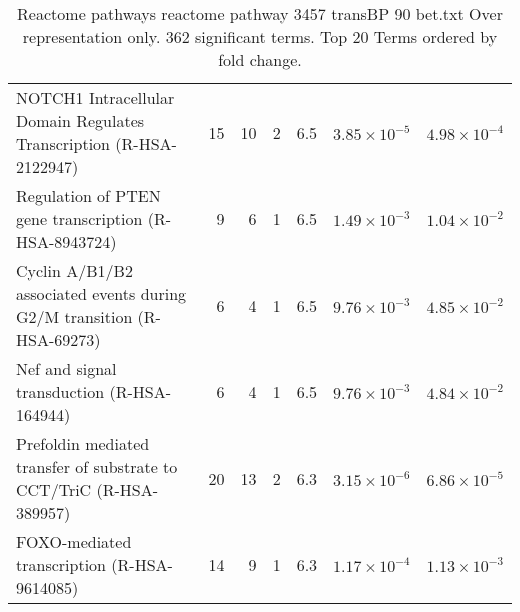 \begin{table}[ht]
\begin{adjustbox}{width=\textwidth}
\begin{tabular}{lrrrrrr}
  NOTCH1 Intracellular Domain Regulates Transcription (R-HSA-2122947) & 15 & 10 & 2 & 6.5 & $3.85 \times 10^{-5}$ & $4.98 \times 10^{-4}$ \\ 
  Regulation of PTEN gene transcription (R-HSA-8943724) & 9 & 6 & 1 & 6.5 & $1.49 \times 10^{-3}$ & $1.04 \times 10^{-2}$ \\ 
  Cyclin A/B1/B2 associated events during G2/M transition (R-HSA-69273) & 6 & 4 & 1 & 6.5 & $9.76 \times 10^{-3}$ & $4.85 \times 10^{-2}$ \\ 
  Nef and signal transduction (R-HSA-164944) & 6 & 4 & 1 & 6.5 & $9.76 \times 10^{-3}$ & $4.84 \times 10^{-2}$ \\ 
  Prefoldin mediated transfer of substrate  to CCT/TriC (R-HSA-389957) & 20 & 13 & 2 & 6.3 & $3.15 \times 10^{-6}$ & $6.86 \times 10^{-5}$ \\ 
  FOXO-mediated transcription (R-HSA-9614085) & 14 & 9 & 1 & 6.3 & $1.17 \times 10^{-4}$ & $1.13 \times 10^{-3}$ \\ 
   \hline
\end{tabular}
\end{adjustbox}
\caption{Reactome pathways reactome pathway 3457 transBP 90 bet.txt Over representation only. 362 significant terms. Top 20 Terms ordered by fold change. } 
\label{tab:Reactome pathways reactome pathway 3457 transBP 90 bet.txt Over representation only. 362 significant terms. Top 20 Terms ordered by fold change. }
\end{table}


